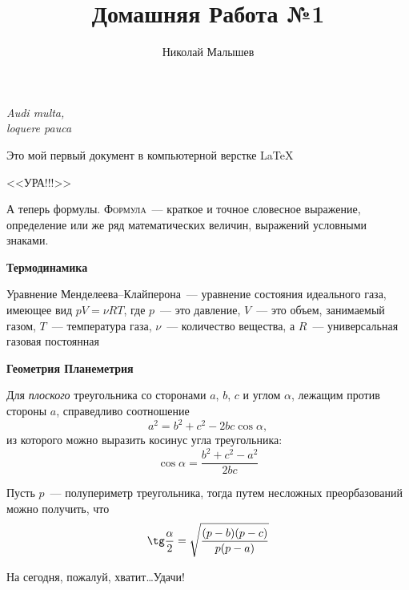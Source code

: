 \documentclass[12pt]{article}
\title{Домашняя Работа №1}
\author{Николай Малышев}
\date{}
\begin{document}
	\maketitle
	\begin{flushright}
		\itshape{ Audi multa,\\loquere pauca}
	\end{flushright}
	\vspace{20pt}\par
	Это мой первый документ в компьютерной верстке \LaTeX 
	\begin{center}
		\sffamily\huge{<<УРА!!!>>}
	\end{center}\par
	А теперь формулы. {\scshape Формула}~--- краткое и точное словесное выражение, определение или же ряд  математических величин, выражений условными знаками.
	
	\vspace{15pt}
	\hspace{14pt} {\bfseries \Large Термодинамика} 
	
	Уравнение Менделеева--Клайперона~--- уравнение состояния идеального газа, имеющее вид $pV = \nu RT$, где $p$~--- это давление, $V$~--- это объем, занимаемый газом, $T$~--- температура газа, $\nu$~--- количество вещества, а $R$~--- универсальная газовая постоянная
	
	\vspace{15pt}
	\hspace{14pt} {\bfseries \Large Геометрия \hfill Планеметрия} 
	 
	Для {\slshape плоского} треугольника со сторонами $a$, $b$, $c$ и углом $\alpha$, лежащим против стороны $a$, справедливо соотношение
	$$ a^2 = b^2 + c^2 - 2bc \cos\alpha, $$ 
	из которого можно выразить косинус угла треугольника:
	$$
	\cos\alpha = {\frac{b^2 + c^2 - a^2}{2bc}}
	$$ \par
	Пусть $p$~--- полупериметр треугольника, тогда путем несложных преорбазований можно получить, что
	$$
	\tg\frac{\alpha}{2} = \sqrt{\frac{(p - b)(p - c)}{p(p - a)}}
	$$
	\vspace{1cm}
	\begin{flushleft}
		На сегодня, пожалуй, хватит\ldots Удачи!
	\end{flushleft}
\end{document}
